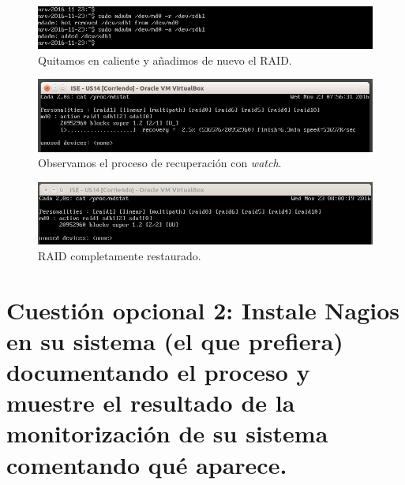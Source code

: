 \documentclass[a4paper,titlepage,12pt]{scrartcl}	%
\numberwithin{figure}{section} %
\numberwithin{table}{section} %
\begin{document}
	\begin{figure}[H]
		\includegraphics[width=\linewidth]{./Imagenes/O1-3.png}
		\vspace{-0.5cm}
		\caption[Quitamos en caliente y añadimos de nuevo el RAID.]{Quitamos en caliente y añadimos de nuevo el RAID.}
		\label{O1-3}
	\end{figure}
	
	\begin{figure}[H]
		\includegraphics[width=\linewidth]{./Imagenes/O1-4.png}
		\vspace{-0.5cm}
		\caption[Observamos el proceso de recuperación con \textit{watch}.]{Observamos el proceso de recuperación con \textit{watch}.}
		\label{O1-4}
	\end{figure}
	
	\begin{figure}[H]
		\includegraphics[width=\linewidth]{./Imagenes/O1-5.png}
		\vspace{-0.5cm}
		\caption[RAID completamente restaurado.]{RAID completamente restaurado.}
		\label{O1-5}
	\end{figure}
	
	\section[Cuestión opcional 2: Instale Nagios en su sistema (el que prefiera) documentando el proceso y muestre el resultado de la monitorización de su sistema comentando qué aparece.]{Cuestión opcional 2: Instale Nagios en su sistema (el que prefiera) documentando el proceso y muestre el resultado de la monitorización de su sistema comentando qué aparece.}
	
\end{document}
